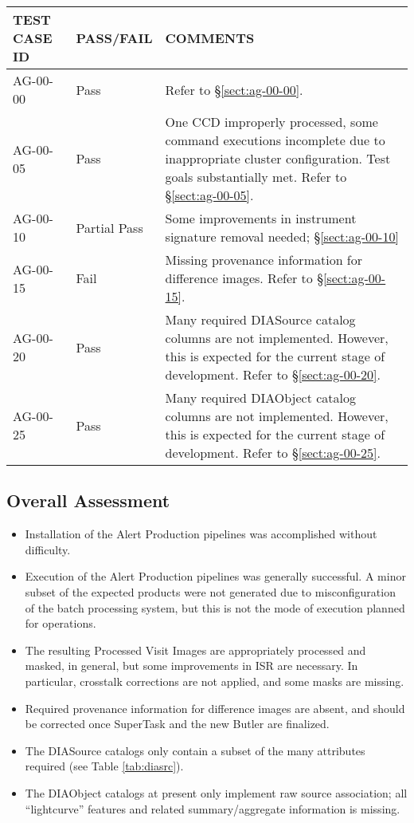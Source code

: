 \documentclass[DM,lsstdraft,STR,toc]{lsstdoc}
\begin{document}
\begin{longtable} {|p{}|p{}|p{}|}\hline
{\bf TEST CASE ID} & {\bf PASS/FAIL} & {\bf COMMENTS} \\\hline
AG-00-00 & Pass & Refer to \S\ref{sect:ag-00-00}. \\\hline
AG-00-05 & Pass & One CCD improperly processed, some command executions incomplete due to inappropriate cluster configuration. Test goals substantially met. Refer to \S\ref{sect:ag-00-05}. \\\hline
AG-00-10 & Partial Pass & Some improvements in instrument signature removal needed; \S\ref{sect:ag-00-10} \\\hline
AG-00-15 & Fail & Missing provenance information for difference images. Refer to \S\ref{sect:ag-00-15}. \\\hline
AG-00-20 & Pass & Many required DIASource catalog columns are not implemented. However, this is expected for the current stage of development. Refer to \S\ref{sect:ag-00-20}. \\\hline
AG-00-25 & Pass & Many required DIAObject catalog columns are not implemented. However, this is expected for the current stage of development. Refer to \S\ref{sect:ag-00-25}. \\\hline
\end{longtable}

\subsection{Overall Assessment \label{sect:overallassessment}}

\begin{itemize}
    \item Installation of the Alert Production pipelines was accomplished without difficulty.
    \item Execution of the Alert Production pipelines was generally successful.
    A minor subset of the expected products were not generated due to misconfiguration of the batch processing system, but this is not the mode of execution planned for operations.
    \item The resulting Processed Visit Images are appropriately processed and masked, in general, but some improvements in ISR are necessary. In particular, crosstalk corrections are not applied, and some masks are missing.
    \item Required provenance information for difference images are absent, and should be corrected once SuperTask and the new Butler are finalized.
    \item The DIASource catalogs only contain a subset of the many attributes required (see Table \ref{tab:diasrc}).
    \item The DIAObject catalogs at present only implement raw source association; all ``lightcurve'' features and related summary/aggregate information is missing.
\end{itemize}
\end{document}
